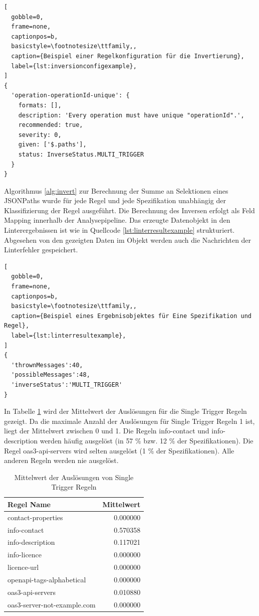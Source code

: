 \lstset{language=JavaScript}
\begin{lstlisting}[
  gobble=0,
  frame=none,
  captionpos=b,
  basicstyle=\footnotesize\ttfamily,,
  caption={Beispiel einer Regelkonfiguration für die Invertierung},
  label={lst:inversionconfigexample},
]
{
  'operation-operationId-unique': {
    formats: [],
    description: 'Every operation must have unique "operationId".',
    recommended: true,
    severity: 0,
    given: ['$.paths'],
    status: InverseStatus.MULTI_TRIGGER
  }
}
\end{lstlisting}

Algorithmus \ref{alg:invert} zur Berechnung der Summe an Selektionen eines JSONPaths wurde für jede Regel und jede Spezifikation unabhängig der Klassifizierung der Regel ausgeführt. Die Berechnung des Inversen erfolgt als Feld Mapping innerhalb der Analysepipeline. Das erzeugte Datenobjekt in den Linterergebnissen ist wie in Quellcode \ref{lst:linterresultexample} strukturiert. Abgesehen von den gezeigten Daten im Objekt werden auch die Nachrichten der Linterfehler gespeichert.

\newpage
\begin{lstlisting}[
  gobble=0,
  frame=none,
  captionpos=b,
  basicstyle=\footnotesize\ttfamily,,
  caption={Beispiel eines Ergebnisobjektes für Eine Spezifikation und Regel},
  label={lst:linterresultexample},
]
{
  'thrownMessages':40,
  'possibleMessages':48,
  'inverseStatus':'MULTI_TRIGGER'
}
\end{lstlisting}

In Tabelle \ref{tab:singletriggerinverts} wird der Mittelwert der Auslösungen für die Single Trigger Regeln gezeigt. Da die maximale Anzahl der Auslösungen für Single Trigger Regeln 1 ist, liegt der Mittelwert zwischen 0 und 1.  Die Regeln info-contact und info-description werden häufig ausgelöst (in 57 \% bzw. 12 \% der Spezifikationen). Die Regel oas3-api-servers wird selten ausgelöst (1 \% der Spezifikationen). Alle anderen Regeln werden nie ausgelöst. 

\begin{longtable}{lr}
  \caption{Mittelwert der Auslösungen von Single Trigger Regeln}
  \label{tab:singletriggerinverts}
  \endfirsthead
  \endhead
  \textbf{Regel Name} & \textbf{Mittelwert} \\ \hline\hline
  contact-properties & 0.000000 \\ 
  info-contact & 0.570358 \\ 
  info-description & 0.117021 \\ 
  info-licence & 0.000000 \\ 
  licence-url & 0.000000 \\ 
  openapi-tags-alphabetical & 0.000000 \\ 
  oas3-api-servers & 0.010880 \\ 
  oas3-server-not-example.com & 0.000000 \\ \hline\hline
\end{longtable}

